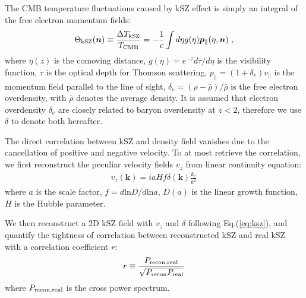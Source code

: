 \label{sec:kszRecon}
The CMB temperature fluctuations caused by kSZ effect is simply an integral of the 
free electron momentum fields:
\begin{eqnarray}
\label{eq:ksz}
\Theta_\mathrm{kSZ}(\bm{n})\equiv\frac{\Delta T_\mathrm{kSZ}}{T_{\mathrm{CMB}}}
=-\frac{1}{c}\int d\eta  g(\eta)  \bm{p}_\parallel(\eta,\bm{n})\ ,
\end{eqnarray}
where $\eta(z)$ is the comoving distance, 
$g(\eta)=e^{-\tau} d\tau/d\eta$ is the visibility function, $\tau$ is the optical depth for Thomson scattering, 
$p_\parallel=(1+\delta_e)v_\parallel$ 
is the momentum field parallel to the line of sight, 
$\delta_e=(\rho-\bar{\rho})/\bar{\rho}$ 
is the free electron overdensity, 
with $\bar\rho$ denotes the average density. 
It is assumed that electron overdensity $\delta_e$ are closely 
related to baryon overdensity at $z<2$, 
therefore we use $\delta$ to denote both hereafter. 

The direct correlation between kSZ and density field vanishes due to the cancellation of positive and negative velocity.
To at most retrieve the correlation,  
we first reconstruct the peculiar velocity fields $v_z$ 
from linear continuity equation:
\begin{eqnarray}
	\label{eq:v}
v_z(\bm{k})=i a H f\delta(\bm{k})\frac{k_z}{k^2}\,
\end{eqnarray}
where $a$ is the scale factor, $f=d\mathrm{ln}D/d\mathrm{ln}a$, $D(a)$ is the linear growth function, 
$H$ is the Hubble parameter.

We then reconstruct a 2D kSZ field with $v_z$ and $\delta$ 
following Eq.(\ref{eq:ksz}), 
and quantify the tightness of correlation between reconstructed kSZ and real kSZ 
with a correlation coefficient $r$: 
\begin{eqnarray}
\label{eq:r}
	r\equiv \frac{P_\mathrm{recon,real}}{\sqrt{P_\mathrm{recon}P_\mathrm{real}}}\,
\end{eqnarray}
where $P_\mathrm{recon,real}$ is the cross power spectrum.

